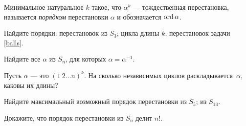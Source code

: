 \documentclass[a4paper,11pt]{article}
\begin{document}
 Минимальное натуральное $k$ такое, что $\alpha^k$ --- тождественная перестановка, называется {\it порядком} перестановки $\alpha$ и обозначается $\operatorname{ord}\alpha$.

Найдите порядки:  перестановок из $S_3$;  цикла длины $k$;  перестановок задачи \ref{balls}.


 Найдите все $\alpha$ из $S_n$, для которых $\alpha=\alpha^{-1}$.

Пусть $\alpha$ --- это $(1\ 2 \dots n)^k$.
На сколько независимых циклов раскладывается~$\alpha$, каковы их длины?

Найдите максимальный возможный порядок перестановки
 из $S_5$;
 из $S_{13}$.

Докажите, что порядок перестановки из $S_n$ делит $n!$.


\end{document}
